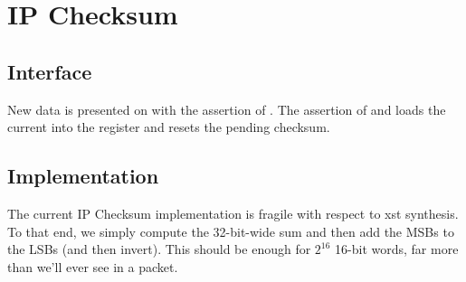 \section{IP Checksum}

\subsection{Interface}
New data is presented on  with the assertion of . The assertion of  and  loads the current  into the register and resets the pending checksum. 

\subsection{Implementation}

The current IP Checksum implementation is fragile with respect to xst synthesis. To that end, we simply compute the 32-bit-wide sum and then add the MSBs to the LSBs (and then invert). This should be enough for $2^{16}$ 16-bit words, far more than we'll ever see in a packet. 



